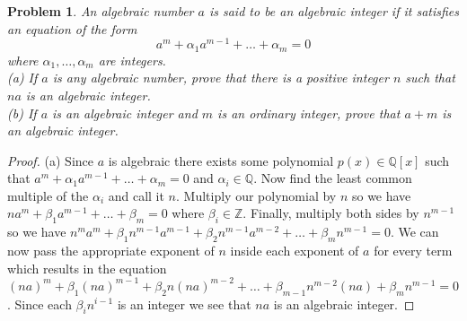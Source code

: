 \documentclass{article}
\newtheorem{problem}{Problem}
\begin{document}
\begin{problem}
An algebraic number $a$ is said to be an algebraic integer if it satisfies an equation of the form
\[
a^m + \alpha_1 a^{m-1} + \dots + \alpha_m = 0
\]
where $\alpha_1, \dots , \alpha_m$ are integers.\\
(a) If $a$ is any algebraic number, prove that there is a positive integer $n$ such that $na$ is an algebraic integer.\\
(b) If $a$ is an algebraic integer and $m$ is an ordinary integer, prove that $a+m$ is an algebraic integer.
\end{problem}
\begin{proof}
(a) Since $a$ is algebraic there exists some polynomial $p(x) \in \mathbb{Q}[x]$ such that $a^m + \alpha_1 a^{m-1} + \dots + \alpha_m = 0$ and $\alpha_i \in \mathbb{Q}$. Now find the least common multiple of the $\alpha_i$ and call it $n$. Multiply our polynomial by $n$ so we have $na^m + \beta_1 a^{m-1} + \dots + \beta_m = 0$ where $\beta_i \in \mathbb{Z}$. Finally, multiply both sides by $n^{m-1}$ so we have $n^m a^m + \beta_1 n^{m-1}a^{m-1} + \beta_2 n^{m-1} a^{m-2} + \dots + \beta_m n^{m-1} = 0$. We can now pass the appropriate exponent of $n$ inside each exponent of $a$ for every term which results in the equation $(na)^m + \beta_1 (na)^{m-1} + \beta_2 n (na)^{m-2} + \dots + \beta_{m-1} n^{m-2} (na) + \beta_m n^{m-1} = 0$. Since each $\beta_in^{i-1}$ is an integer we see that $na$ is an algebraic integer.


\end{proof}
\end{document}
